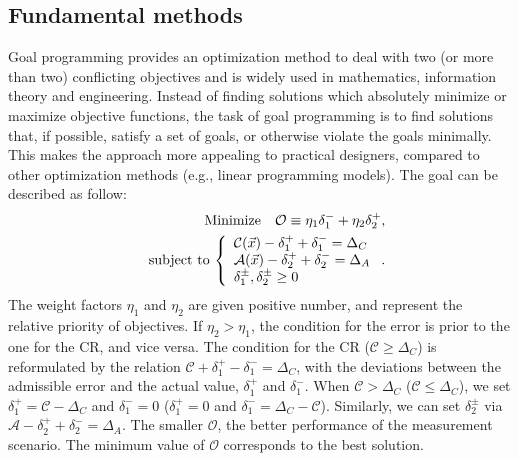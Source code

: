 \documentclass[journal]{IEEEtran}
\begin{document}
\subsection{Fundamental methods}
Goal programming provides an optimization method to deal with two (or more than two) conflicting objectives and is widely used in mathematics, information theory and engineering. Instead of finding solutions which absolutely minimize or maximize objective functions, the task of goal programming is to find solutions that, if possible, satisfy a set of goals, or otherwise violate the goals minimally. This makes the approach more appealing to practical designers, compared to other optimization methods (e.g., linear programming models). The goal can be described as follow:
\begin{eqnarray}
&&
{\rm Minimize}\quad
\mathcal{O}\equiv \eta_{1}\delta_{1}^{-} + \eta_{2}\delta_{2}^{+},
 \nonumber \\
&&
{\rm subject\,\,to}\,
\left\{
\begin{array}{l}
\mathcal{C}(\vec{x})-\delta_{1}^{+}+\delta_{1}^{-} = \Delta_{C} \\
\mathcal{A}(\vec{x})-\delta_{2}^{+}+\delta_{2}^{-} = \Delta_{A} \\
\delta_{1}^{\pm},\delta_{2}^{\pm} \ge 0
\end{array}
\right. .
\label{GP}
\end{eqnarray}
The weight factors $\eta_{1}$ and $\eta_{2}$ are given positive number, and represent the relative priority of objectives. If $\eta_{2} > \eta_{1}$, the condition for the error is prior to the one for the CR, and vice versa. The condition for the CR ($\mathcal{C} \geq \Delta_{C}$) is reformulated by the relation \( \mathcal{C} +\delta_{1}^{+}-\delta_{1}^{-} = \Delta_{C} \), with the deviations between the admissible error and the actual value, $\delta_{1}^{+}$ and $\delta_{1}^{-}$. When $\mathcal{C} > \Delta_{C}$ ($\mathcal{C} \le \Delta_{C}$), we set $\delta_{1}^{+}=\mathcal{C}-\Delta_{C}$ and $\delta_{1}^{-}=0$ ($\delta_{1}^{+}=0$ and $\delta_{1}^{-}=\Delta_{C}-\mathcal{C}$). Similarly, we can set $\delta_{2}^{\pm}$ via $\mathcal{A}-\delta_{2}^{+}+\delta_{2}^{-}=\Delta_{A}$. The smaller $\mathcal{O}$, the better performance of the measurement scenario. The minimum value of $\mathcal{O}$ corresponds to the best solution.
\end{document}
